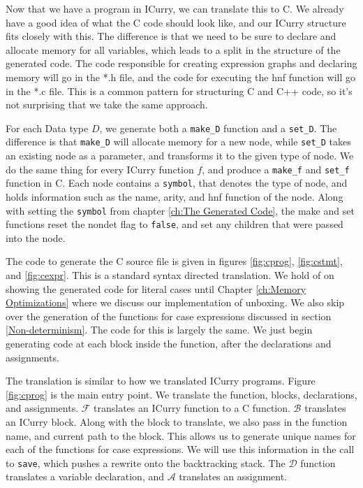 \documentclass{book}
\theoremstyle{definition}
\newcommand{\Conid}[1]{\mathit{#1}}
\newcommand{\Varid}[1]{\mathit{#1}}
\begin{document}
Now that we have a program in ICurry, we can translate this to C.
We already have a good idea of what the C code should look like,
and our ICurry structure fits closely with this.
The difference is that we need to be sure to declare and allocate memory for all variables,
which leads to a split in the structure of the generated code.
The code responsible for creating expression graphs and declaring memory will
go in the *.h file, and the code for executing the hnf function will go in the *.c file.
This is a common pattern for structuring C and C++ code,
so it's not surprising that we take the same approach.

For each Data type \ensuremath{\Conid{D}}, we generate both a \texttt{make\_D} function and a \texttt{set\_D}.
The difference is that \texttt{make\_D} will allocate memory for a new node, while \texttt{set\_D}
takes an existing node as a parameter, and transforms it to the given type of node.
We do the same thing for every ICurry function \ensuremath{\Varid{f}},
and produce a \texttt{make\_f} and \texttt{set\_f} function in C.
Each node contains a \texttt{symbol}, that denotes the type of node, and holds information
such as the name, arity, and hnf function of the node.
Along with setting the \texttt{symbol} from chapter \ref{ch:The Generated Code},
the make and set functions reset the nondet flag to \texttt{false},
and set any children that were passed into the node.


The code to generate the C source file is given in 
figures \ref{fig:cprog}, \ref{fig:cstmt}, and \ref{fig:cexpr}.
This is a standard syntax directed translation.
We hold of on showing the generated code for literal cases until Chapter \ref{ch:Memory Optimizations}
where we discuss our implementation of unboxing.
We also skip over the generation of the functions for case expressions discussed in section
\ref{Non-determinism}.
The code for this is largely the same.
We just begin generating code at each block inside the function, after the declarations and assignments.

The translation is similar to how we translated ICurry programs.
Figure \ref{fig:cprog} is the main entry point.
We translate the function, blocks, declarations, and assignments.
$\mathcal{F}$ translates an  ICurry function to a C function.
$\mathcal{B}$ translates an ICurry block.
Along with the block to translate, we also pass in the function name, and current path
to the block.
This allows us to generate unique names for each of the functions for case expressions.
We will use this information in the call to \texttt{save}, which pushes a rewrite onto
the backtracking stack.
The $\mathcal{D}$ function translates a variable declaration,
and $\mathcal{A}$ translates an assignment.
\end{document}
